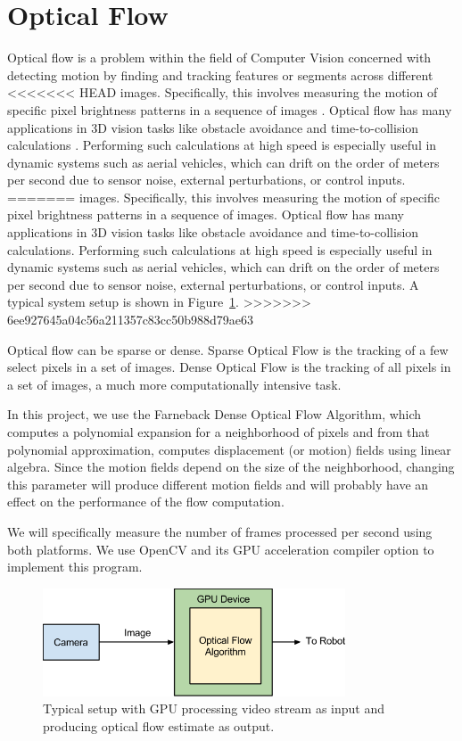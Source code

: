 \documentclass[12pt,letterpaper]{article}
\begin{document}
\section{Optical Flow}
Optical flow is a problem within the field of Computer Vision concerned with
detecting motion by finding and tracking features or segments across different
<<<<<<< HEAD
images\cite{opticalflowtechniques}. Specifically, this involves measuring the
motion of specific pixel brightness patterns in a sequence of images
\cite{opticalflowtechniques}. Optical flow has many applications
in 3D vision tasks like obstacle avoidance and time-to-collision calculations
\cite{opticalflowgpu}. Performing such calculations at high speed is especially
useful in dynamic systems such as aerial vehicles, which can drift on the order
of meters per second due to sensor noise, external perturbations, or control
inputs.
=======
images. Specifically, this involves measuring the motion of specific pixel
brightness patterns in a sequence of images. Optical flow has many applications
in 3D vision tasks like obstacle avoidance and time-to-collision calculations.
Performing such calculations at high speed is especially useful in dynamic
systems such as aerial vehicles, which can drift on the order of meters per
second due to sensor noise, external perturbations, or control inputs.
A typical system setup is shown in Figure~\ref{fig:sys}.
>>>>>>> 6ee927645a04c56a211357c83cc50b988d79ae63

Optical flow can be sparse or dense. Sparse Optical Flow is the tracking of
a few select pixels in a set of images. Dense Optical Flow is the tracking of
all pixels in a set of images, a much more computationally intensive task.

In this project, we use the Farneback Dense Optical Flow Algorithm, which
computes a polynomial expansion for a neighborhood of pixels and from that
polynomial approximation, computes displacement (or motion) fields using linear
algebra\cite{farneback}. Since the motion fields depend on the size of the
neighborhood, changing this parameter will produce different motion fields and
will probably have an effect on the performance of the flow computation.

We will specifically measure the number of frames processed per second using
both platforms. We use OpenCV and its GPU acceleration compiler option to
implement this program.

\begin{figure}[H]
  \centering
  \includegraphics[width=0.8\textwidth]{img/sys.png}
  \caption{Typical setup with GPU processing video stream as input and producing optical flow estimate as output.}
  \label{fig:sys}
\end{figure}
\end{document}
